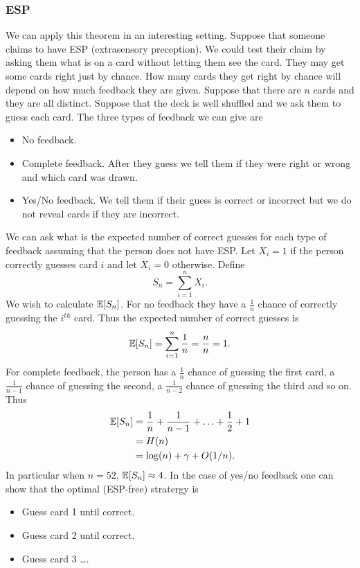 \subsubsection{ESP}
We can apply this theorem in an interesting setting. Suppose that someone claims to have ESP (extrasensory preception). We could test their claim by asking them what is on a card without letting them see the card. They may get some cards right just by chance. How many cards they get right by chance will depend on how much feedback they are given. Suppose that there are $n$ cards and they are all distinct. Suppose that the deck is well shuffled and we ask them to guess each card. The three types of feedback we can give are
\begin{itemize}
    \item No feedback.
    \item Complete feedback. After they guess we tell them if they were right or wrong and which card was drawn.
    \item Yes/No feedback. We tell them if their guess is correct or incorrect but we do not reveal cards if they are incorrect.
\end{itemize} 
We can ask what is the expected number of correct guesses for each type of feedback assuming that the person does not have ESP. Let $X_i = 1$ if the person correctly guesses card $i$ and let  $X_i = 0$ otherwise. Define 
\[S_n = \sum_{i=1}^n X_i.\]
We wish to calculate ${\mathbb{E}}[S_n]$. For no feedback they have a $\frac{1}{n}$ chance of correctly guessing the $i^{th}$ card. Thus the expected number of correct guesses is
\[{\mathbb{E}}[S_n]=\sum_{i=1}^n \frac{1}{n} = \frac{n}{n} =1.\]
For complete feedback, the person has a $\frac{1}{n}$ chance of guessing the first card, a $\frac{1}{n-1}$ chance of guessing the second, a $\frac{1}{n-2}$ chance of guessing the third and so on. Thus
\begin{align*}
    {\mathbb{E}}[S_n]&=\frac{1}{n}+\frac{1}{n-1}+\ldots+\frac{1}{2}+1\\
    &=H(n)\\
    &=\log(n) + \gamma + O(1/n).
\end{align*} 
In particular when $n=52$, ${\mathbb{E}}[S_n] \approx  4$. In the case of yes/no feedback one can show that the optimal (ESP-free) stratergy is
\begin{itemize}
    \item Guess card 1 until correct.
    \item Guess card 2 until correct.
    \item Guess card 3 \ldots.
\end{itemize}
